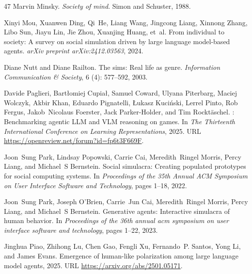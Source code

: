 \begin{thebibliography}{47}
Marvin Minsky.
\newblock \emph{Society of mind}.
\newblock Simon and Schuster, 1988.

Xinyi Mou, Xuanwen Ding, Qi~He, Liang Wang, Jingcong Liang, Xinnong Zhang, Libo Sun, Jiayu Lin, Jie Zhou, Xuanjing Huang, et~al.
\newblock From individual to society: A survey on social simulation driven by large language model-based agents.
\newblock \emph{arXiv preprint arXiv:2412.03563}, 2024.

Diane Nutt and Diane Railton.
\newblock The sims: Real life as genre.
\newblock \emph{Information Communication \& Society}, 6 (4): 577--592, 2003.

Davide Paglieri, Bart{\l}omiej Cupia{\l}, Samuel Coward, Ulyana Piterbarg, Maciej Wolczyk, Akbir Khan, Eduardo Pignatelli, {\L}ukasz Kuci{\'n}ski, Lerrel Pinto, Rob Fergus, Jakob~Nicolaus Foerster, Jack Parker-Holder, and Tim Rockt{\"a}schel.
: Benchmarking agentic {LLM} and {VLM} reasoning on games.
\newblock In \emph{The Thirteenth International Conference on Learning Representations}, 2025.
\newblock URL \url{https://openreview.net/forum?id=fp6t3F669F}.

Joon~Sung Park, Lindsay Popowski, Carrie Cai, Meredith~Ringel Morris, Percy Liang, and Michael~S Bernstein.
\newblock Social simulacra: Creating populated prototypes for social computing systems.
\newblock In \emph{Proceedings of the 35th Annual ACM Symposium on User Interface Software and Technology}, pages 1--18, 2022.

Joon~Sung Park, Joseph O'Brien, Carrie~Jun Cai, Meredith~Ringel Morris, Percy Liang, and Michael~S Bernstein.
\newblock Generative agents: Interactive simulacra of human behavior.
\newblock In \emph{Proceedings of the 36th annual acm symposium on user interface software and technology}, pages 1--22, 2023.

Jinghua Piao, Zhihong Lu, Chen Gao, Fengli Xu, Fernando~P. Santos, Yong Li, and James Evans.
\newblock Emergence of human-like polarization among large language model agents, 2025{}.
\newblock URL \url{https://arxiv.org/abs/2501.05171}.


\end{thebibliography}
